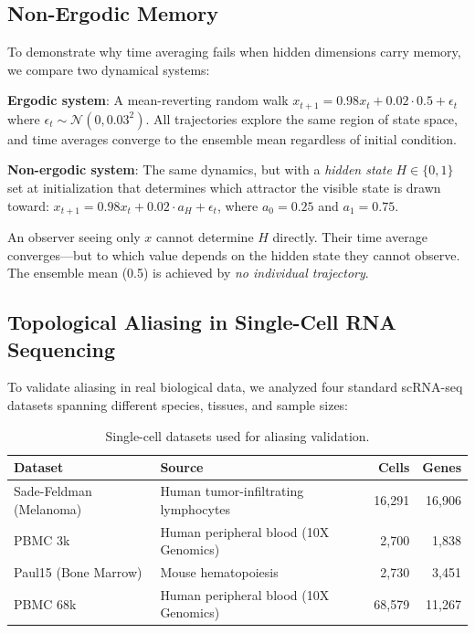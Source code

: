 \documentclass[12pt]{article}
\begin{document}
\subsection{Non-Ergodic Memory}

To demonstrate why time averaging fails when hidden dimensions carry memory, we compare two dynamical systems:

\textbf{Ergodic system}: A mean-reverting random walk $x_{t+1} = 0.98 x_t + 0.02 \cdot 0.5 + \epsilon_t$ where $\epsilon_t \sim \mathcal{N}(0, 0.03^2)$. All trajectories explore the same region of state space, and time averages converge to the ensemble mean regardless of initial condition.

\textbf{Non-ergodic system}: The same dynamics, but with a \emph{hidden state} $H \in \{0, 1\}$ set at initialization that determines which attractor the visible state is drawn toward: $x_{t+1} = 0.98 x_t + 0.02 \cdot a_H + \epsilon_t$, where $a_0 = 0.25$ and $a_1 = 0.75$.

An observer seeing only $x$ cannot determine $H$ directly. Their time average converges---but to which value depends on the hidden state they cannot observe. The ensemble mean (0.5) is achieved by \emph{no individual trajectory}.

\subsection{Topological Aliasing in Single-Cell RNA Sequencing}

To validate aliasing in real biological data, we analyzed four standard scRNA-seq datasets spanning different species, tissues, and sample sizes:

\begin{table}[h]
\centering
\begin{tabular}{@{}llrr@{}}
\toprule
\textbf{Dataset} & \textbf{Source} & \textbf{Cells} & \textbf{Genes} \\
\midrule
Sade-Feldman (Melanoma) & Human tumor-infiltrating lymphocytes & 16,291 & 16,906 \\
PBMC 3k & Human peripheral blood (10X Genomics) & 2,700 & 1,838 \\
Paul15 (Bone Marrow) & Mouse hematopoiesis & 2,730 & 3,451 \\
PBMC 68k & Human peripheral blood (10X Genomics) & 68,579 & 11,267 \\
\bottomrule
\end{tabular}
\caption{Single-cell datasets used for aliasing validation.}
\label{tab:datasets}
\end{table}
\end{document}
